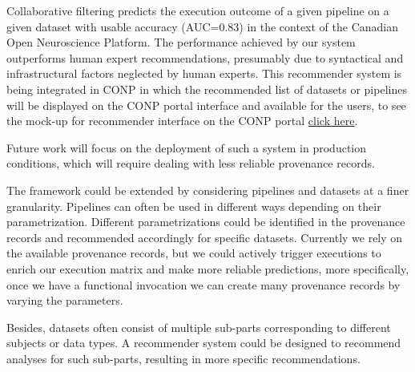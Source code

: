 Collaborative filtering predicts the execution outcome of a given pipeline
on a given dataset with usable accuracy (AUC=0.83) in the context of the
Canadian Open Neuroscience Platform. The performance achieved by our system
outperforms
human expert recommendations, presumably due to syntactical and
infrastructural factors neglected by human experts. This recommender system is being integrated in CONP in which the recommended list of datasets or pipelines will be displayed on the CONP portal interface and available for the users, to see the mock-up for recommender interface on the CONP portal \href{https://github.com/mandana-mazaheri/Pipelines-datasets-recommender-paper/blob/master/result/mockup_for_recommender_on_portal.png}{ click here}. 

Future work will focus on the deployment of such a system in production conditions, which will require dealing with less reliable provenance records.

The framework could be extended by considering pipelines and datasets 
at a finer granularity. Pipelines can often be used in different ways 
depending on their parametrization. Different parametrizations could 
be identified in the provenance records and recommended accordingly 
for specific datasets.
Currently we rely on the available provenance records, but we could actively trigger executions to enrich our execution matrix and make more reliable predictions, more specifically, once we have a functional invocation we can create many provenance records by varying the parameters.


Besides, datasets often consist of multiple 
sub-parts corresponding to different subjects or data types. A recommender 
system could be designed to recommend analyses for such sub-parts, 
resulting in more specific recommendations.







